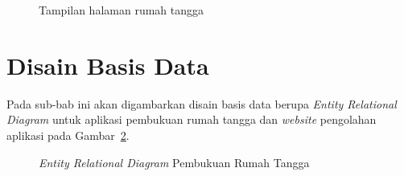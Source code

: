 \begin{figure}
\centering
{}
\caption[Tampilan halaman rumah tangga]{Tampilan halaman rumah tangga} 
\label{fig:design_web_index_rumah_tangga}
\end{figure}

\section{Disain Basis Data}
\label{sec:disainbasisdata}

Pada sub-bab ini akan digambarkan disain basis data berupa \textit{Entity Relational Diagram} untuk aplikasi pembukuan rumah tangga dan \textit{website} pengolahan aplikasi pada Gambar~\ref{fig:er_diagram_prt}.

\begin{figure}[h]
\centering
{}
\caption[\textit{Entity Relational Diagram} Pembukuan Rumah Tangga]{\textit{Entity Relational Diagram} Pembukuan Rumah Tangga} 
\label{fig:er_diagram_prt}
\end{figure}


